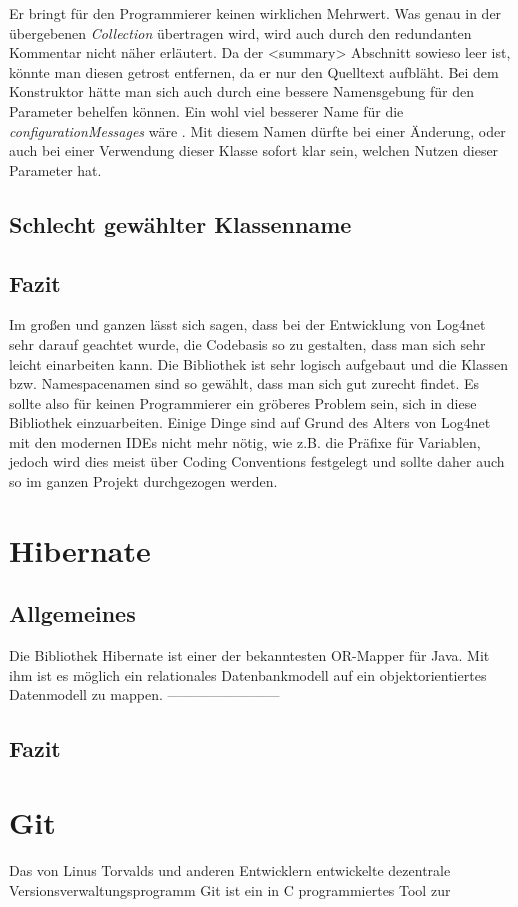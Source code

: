 Er bringt für den Programmierer keinen wirklichen Mehrwert. Was genau in der übergebenen \textit{Collection} übertragen wird, wird auch durch den redundanten Kommentar nicht näher erläutert. Da der <summary> Abschnitt sowieso leer ist, könnte man diesen getrost entfernen, da er nur den Quelltext aufbläht. Bei dem Konstruktor hätte man sich auch durch eine bessere Namensgebung für den Parameter behelfen können. Ein wohl viel besserer Name für die \textit{configurationMessages} wäre \textit{}. Mit diesem Namen dürfte bei einer Änderung, oder auch bei einer Verwendung dieser Klasse sofort klar sein, welchen Nutzen dieser Parameter hat.

\subsection{Schlecht gewählter Klassenname}


\subsection{Fazit}
Im großen und ganzen lässt sich sagen, dass bei der Entwicklung von Log4net sehr darauf geachtet wurde, die Codebasis so zu gestalten, dass man sich sehr leicht einarbeiten kann. Die Bibliothek ist sehr logisch aufgebaut und die Klassen bzw. Namespacenamen sind so gewählt, dass man sich gut zurecht findet. Es sollte also für keinen Programmierer ein gröberes Problem sein, sich in diese Bibliothek einzuarbeiten. Einige Dinge sind auf Grund des Alters von Log4net mit den modernen IDEs nicht mehr nötig, wie z.B. die Präfixe für Variablen, jedoch wird dies meist über Coding Conventions festgelegt und sollte daher auch so im ganzen Projekt durchgezogen werden.

\section{Hibernate}
\subsection{Allgemeines}
Die Bibliothek Hibernate ist einer der bekanntesten OR-Mapper für Java. Mit ihm ist es möglich ein relationales Datenbankmodell auf ein objektorientiertes Datenmodell zu mappen. ------------------------

\subsection{Fazit}

\section{Git}
Das von Linus Torvalds und anderen Entwicklern entwickelte dezentrale Versionsverwaltungsprogramm Git ist ein in C programmiertes Tool zur 